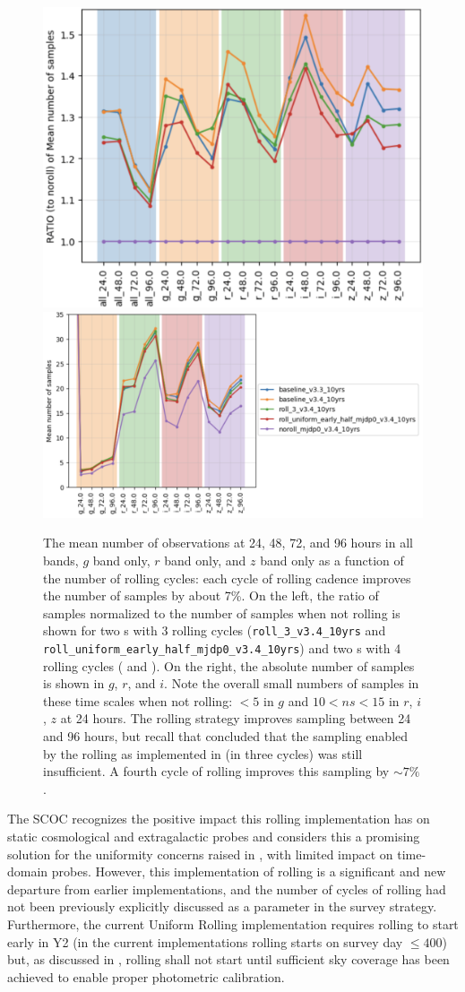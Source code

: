 \begin{figure}
    \centering
    \includegraphics[width=0.4\linewidth]{figures/rolling_sampling.png}\includegraphics[width=0.58\linewidth]{figures/rolling_nsamples.png}
    \caption{The mean number of observations at 24, 48, 72, and 96 hours in all bands, $g$ band only, $r$ band only, and $z$ band only as a function of the number of rolling cycles: each cycle of rolling cadence improves the number of samples by about 7\%. On the left, the ratio of samples normalized to the number of samples when not rolling is shown for two \opsim s with 3 rolling cycles (\texttt{roll\_3\_v3.4\_10yrs} and \texttt{roll\_uniform\_early\_half\_mjdp0\_v3.4\_10yrs}) and two \opsim s with 4 rolling cycles ( and ). On the right, the absolute number of samples is shown in $g$, $r$, and $i$. Note the overall small numbers of samples in these time scales when not rolling: $<5$ in $g$ and  $10<ns< 15$ in $r$, $i$, $z$ at 24 hours. The rolling strategy improves sampling between 24 and 96 hours, but recall that  concluded that the sampling enabled by the rolling as implemented in  (in three cycles) was still insufficient. A fourth cycle of rolling improves this sampling by $\sim7\%$.}
    \label{fig:rolling_sampling}
\end{figure}

The SCOC recognizes the positive impact this rolling implementation has on static cosmological and extragalactic probes and considers this a promising solution for the uniformity concerns raised in , with limited impact on time-domain probes. However, this implementation of rolling is a significant and new departure from earlier implementations, and the number of cycles of rolling had not been previously explicitly discussed as a parameter in the survey strategy. Furthermore, the current Uniform Rolling implementation requires rolling to start early in Y2 (in the current implementations rolling starts on survey day $\leq 400$) but, as discussed in , rolling shall not start until sufficient sky coverage has been achieved to enable proper photometric calibration.%

